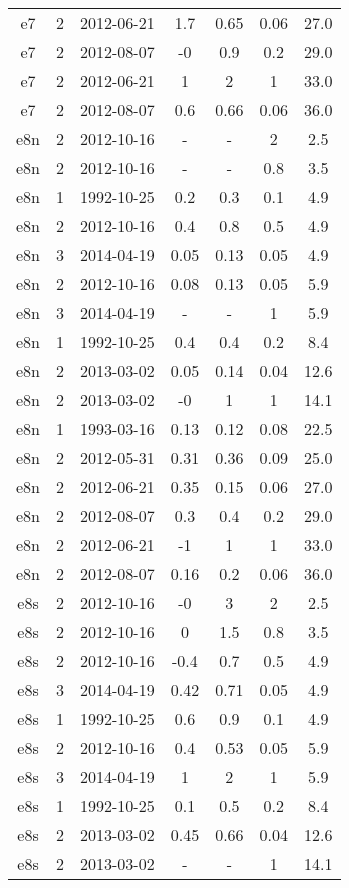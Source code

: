 \begin{table*}[htp]
\begin{tabular}{ccccccc}
e7 & 2 & 2012-06-21 & 1.7 & 0.65 & 0.06 & 27.0 \\
e7 & 2 & 2012-08-07 & -0 & 0.9 & 0.2 & 29.0 \\
e7 & 2 & 2012-06-21 & 1 & 2 & 1 & 33.0 \\
e7 & 2 & 2012-08-07 & 0.6 & 0.66 & 0.06 & 36.0 \\
e8n & 2 & 2012-10-16 & - & - & 2 & 2.5 \\
e8n & 2 & 2012-10-16 & - & - & 0.8 & 3.5 \\
e8n & 1 & 1992-10-25 & 0.2 & 0.3 & 0.1 & 4.9 \\
e8n & 2 & 2012-10-16 & 0.4 & 0.8 & 0.5 & 4.9 \\
e8n & 3 & 2014-04-19 & 0.05 & 0.13 & 0.05 & 4.9 \\
e8n & 2 & 2012-10-16 & 0.08 & 0.13 & 0.05 & 5.9 \\
e8n & 3 & 2014-04-19 & - & - & 1 & 5.9 \\
e8n & 1 & 1992-10-25 & 0.4 & 0.4 & 0.2 & 8.4 \\
e8n & 2 & 2013-03-02 & 0.05 & 0.14 & 0.04 & 12.6 \\
e8n & 2 & 2013-03-02 & -0 & 1 & 1 & 14.1 \\
e8n & 1 & 1993-03-16 & 0.13 & 0.12 & 0.08 & 22.5 \\
e8n & 2 & 2012-05-31 & 0.31 & 0.36 & 0.09 & 25.0 \\
e8n & 2 & 2012-06-21 & 0.35 & 0.15 & 0.06 & 27.0 \\
e8n & 2 & 2012-08-07 & 0.3 & 0.4 & 0.2 & 29.0 \\
e8n & 2 & 2012-06-21 & -1 & 1 & 1 & 33.0 \\
e8n & 2 & 2012-08-07 & 0.16 & 0.2 & 0.06 & 36.0 \\
e8s & 2 & 2012-10-16 & -0 & 3 & 2 & 2.5 \\
e8s & 2 & 2012-10-16 & 0 & 1.5 & 0.8 & 3.5 \\
e8s & 2 & 2012-10-16 & -0.4 & 0.7 & 0.5 & 4.9 \\
e8s & 3 & 2014-04-19 & 0.42 & 0.71 & 0.05 & 4.9 \\
e8s & 1 & 1992-10-25 & 0.6 & 0.9 & 0.1 & 4.9 \\
e8s & 2 & 2012-10-16 & 0.4 & 0.53 & 0.05 & 5.9 \\
e8s & 3 & 2014-04-19 & 1 & 2 & 1 & 5.9 \\
e8s & 1 & 1992-10-25 & 0.1 & 0.5 & 0.2 & 8.4 \\
e8s & 2 & 2013-03-02 & 0.45 & 0.66 & 0.04 & 12.6 \\
e8s & 2 & 2013-03-02 & - & - & 1 & 14.1 \\

\end{tabular}
\end{table*}
